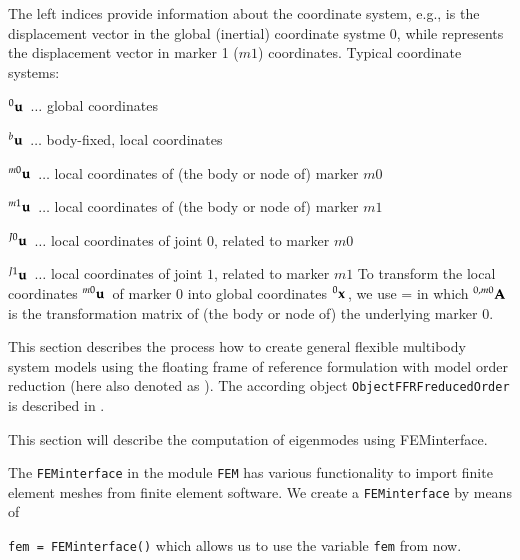 %
\noindent The left indices provide information about the coordinate system, e.g.,
\be
\ee
is the displacement vector in the global (inertial) coordinate systme $0$, while 
\be
\ee
represents the displacement vector in marker 1 ($m1$) coordinates. Typical coordinate systems:
\bi
  \item $\prescript{0}{}{\mathbf{u}}\,$ $\ldots$ global coordinates
  \item $\prescript{b}{}{\mathbf{u}}\,$ $\ldots$ body-fixed, local coordinates
  \item $\prescript{m0}{}{\mathbf{u}}\,$ $\ldots$ local coordinates of (the body or node of) marker $m0$
  \item $\prescript{m1}{}{\mathbf{u}}\,$ $\ldots$ local coordinates of (the body or node of) marker $m1$
  \item $\prescript{J0}{}{\mathbf{u}}\,$ $\ldots$ local coordinates of joint $0$, related to marker $m0$
  \item $\prescript{J1}{}{\mathbf{u}}\,$ $\ldots$ local coordinates of joint $1$, related to marker $m1$
\ei
To transform the local coordinates $\prescript{m0}{}{\mathbf{u}}\,$ of marker 0 into global coordinates $\prescript{0}{}{\mathbf{x}}\,$, we use
\be
   =  
\ee
in which $\prescript{0,m0}{}{\mathbf{A}}\,$ is the transformation matrix of (the body or node of) the underlying marker 0.





\newpage
{}
\label{sec:theory:CMS}

This section describes the process how to create general flexible multibody system models using the floating frame of reference formulation with model order reduction (here also denoted as ). The according object \texttt{ObjectFFRFreducedOrder} is described in .

This section will describe the computation of eigenmodes using FEMinterface.

The \texttt{FEMinterface} in the module \texttt{FEM} has various functionality to import finite element meshes from finite element software.
We create a \texttt{FEMinterface} by means of
\bi
  \item[] \texttt{fem = FEMinterface()}
\ei
which allows us to use the variable \texttt{fem} from now.

